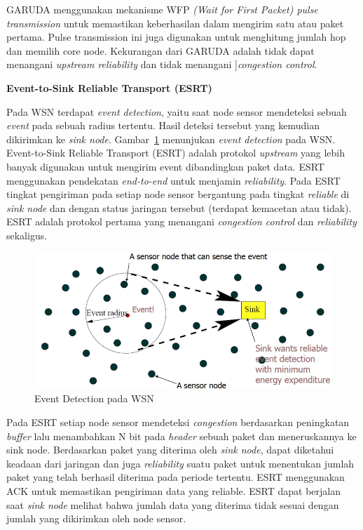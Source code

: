 \documentclass[a4paper,twoside]{article}
\begin{document}
\begin{enumerate}
GARUDA menggunakan mekanisme WFP \textit{(Wait for First Packet) pulse transmission} untuk memastikan keberhasilan dalam mengirim satu atau paket pertama. Pulse transmission ini juga digunakan untuk menghitung jumlah hop dan memilih core node. Kekurangan dari GARUDA adalah tidak dapat menangani \textit{upstream reliability} dan tidak menangani ]\textit{congestion control}.  

\textbf{Event-to-Sink Reliable Transport (ESRT)}

Pada WSN terdapat \textit{event detection}, yaitu saat node sensor mendeteksi sebuah \textit{event} pada sebuah radius tertentu. Hasil deteksi tersebut yang kemudian dikirimkan ke \textit{sink node}. Gambar~\ref{fig:event_detection} menunjukan \textit{event detection} pada WSN. Event-to-Sink Reliable Transport (ESRT) adalah protokol \textit{upstream} yang lebih banyak digunakan untuk mengirim event dibandingkan paket data. ESRT menggunakan pendekatan \textit{end-to-end} untuk menjamin \textit{reliability}. Pada ESRT tingkat pengiriman pada setiap node sensor bergantung pada tingkat \textit{reliable} di \textit{sink node} dan dengan status jaringan tersebut (terdapat kemacetan atau tidak). ESRT adalah protokol pertama yang menangani \textit{congestion control} dan \textit{reliability} sekaligus. 

\begin{figure} [H]
	\centering  
	\includegraphics[scale=0.6]{Gambar/event_detection}  
	\caption[Event Detection pada WSN]{Event Detection pada WSN} 
	\label{fig:event_detection} 
\end{figure} 

Pada ESRT setiap node sensor mendeteksi \textit{congestion} berdasarkan peningkatan \textit{buffer} lalu menambahkan N bit pada \textit{header} sebuah paket dan meneruskannya ke sink node. Berdasarkan paket yang diterima oleh \textit{sink node}, dapat diketahui keadaan dari jaringan dan juga \textit{reliability} suatu paket untuk menentukan jumlah paket yang telah berhasil diterima pada periode tertentu. ESRT menggunakan ACK untuk memastikan pengiriman data yang reliable. ESRT dapat berjalan saat \textit{sink node} melihat bahwa jumlah data yang diterima tidak sesuai dengan jumlah yang dikirimkan oleh node sensor.


\end{enumerate}
\end{document}

